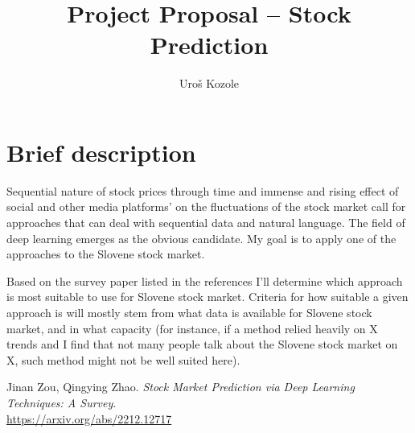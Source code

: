 \documentclass{article}
\title{Project Proposal -- Stock Prediction}
\author{Uroš Kozole}
\begin{document}
\maketitle



\section{Brief description}

Sequential nature of stock prices through time and immense and rising effect of social and other media platforms' on the fluctuations
of the stock market call for approaches that can deal with sequential data and natural language. The field of deep 
learning emerges as the obvious candidate. My goal is to apply one of the approaches to the Slovene stock market.

Based on the survey paper listed in the references I'll determine which approach is most suitable to use for Slovene
stock market. Criteria for how suitable a given approach is will mostly stem from what data is available for Slovene
stock market, and in what capacity (for instance, if a method relied heavily on X trends and I find that not many people
talk about the Slovene stock market on X, such method might not be well suited here).


\begin{thebibliography}{9}

Jinan Zou, Qingying Zhao. 
\textit{Stock Market Prediction via Deep Learning Techniques: A Survey}.
\\\url{https://arxiv.org/abs/2212.12717}
\end{thebibliography}


\end{document}
